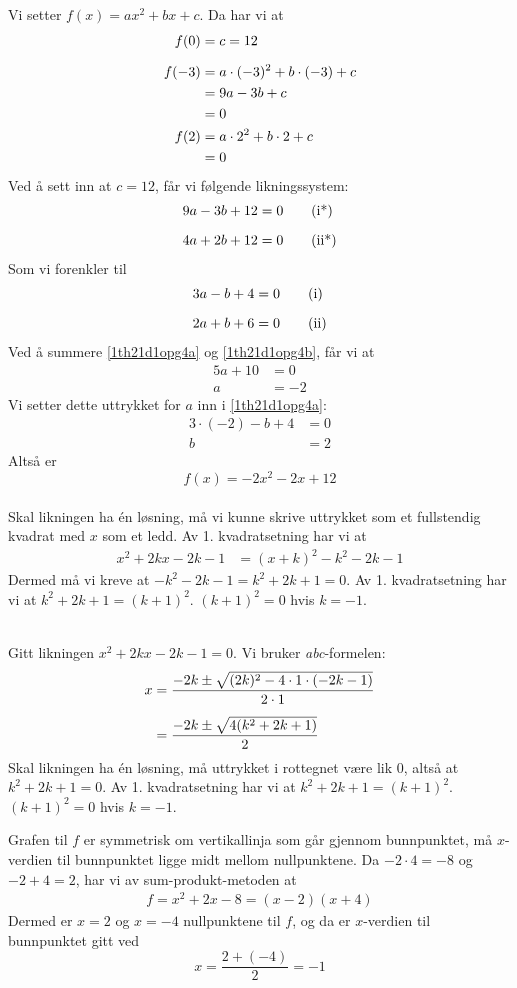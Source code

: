 \newpage
{}
Vi setter $f(x)=ax^2+bx+c$. Da har vi at
\begin{align*}
	f(0)&=c=12 \vn
	f(-3)&=a\cdot(-3)^2+b\cdot(-3)+c \\
	&= 9a-3b+c \\
	&=0 \\
	f(2)&=a\cdot2^2+b\cdot2+c \\
	&= 0
\end{align*}
Ved å sett inn at $c=12$, får vi følgende likningssystem:
\begin{align*}
	9a-3b+12 &= 0 \tag{i*} \vn
	4a+2b+12 &= 0 \tag{ii*}
\end{align*}
Som vi forenkler til
\begin{align*}
	3a-b+4 &= 0 \tag{i}\label{1th21d1opg4a} \vn
	2a+b+6 &= 0 \tag{ii}\label{1th21d1opg4b}
\end{align*}
Ved å summere \eqref{1th21d1opg4a} og \eqref{1th21d1opg4b}, får vi at
\begin{align*}
	5a+10 &= 0 \\
	a &= -2
\end{align*}
Vi setter dette uttrykket for $a$ inn i \eqref{1th21d1opg4a}:
\begin{align*}
	3\cdot(-2)-b+4 &= 0 \\
	b &= 2
\end{align*}
Altså er
\[ f(x)=-2x^2-2x+12 \]
 \vs
{} \\
Skal likningen ha én løsning, må vi kunne skrive uttrykket som et fullstendig kvadrat med $x$ som et ledd. Av 1. kvadratsetning har vi at
\begin{align*}
	x^2+2kx-2k-1 &= (x+k)^2-k^2-2k-1
\end{align*}
Dermed må vi kreve at $-k^2-2k-1=k^2+2k+1=0$. Av 1. kvadratsetning har vi at $k^2+2k+1=(k+1)^2$. $(k+1)^2=0$ hvis $k=-1$. \os

 \\
Gitt likningen $x^2+2kx-2k-1=0$. Vi bruker \textit{abc}-formelen:
\begin{align*}
	x &= \frac{-2k\pm\sqrt{(2k)^2-4\cdot1\cdot(-2k-1)}}{2\cdot1} \br
	&= \frac{-2k\pm\sqrt{4(k^2+2k+1)}}{2}
\end{align*} 
Skal likningen ha én løsning, må uttrykket i rottegnet være lik 0, altså at $k^2+2k+1=0$. Av 1. kvadratsetning har vi at $k^2+2k+1=(k+1)^2$. $(k+1)^2=0$ hvis $k=-1$.

Grafen til $ f $ er symmetrisk om vertikallinja som går gjennom bunnpunktet, må $x$-verdien til bunnpunktet ligge midt mellom nullpunktene. Da $-2\cdot4=-8$ og $-2+4=2$, har vi av sum-produkt-metoden at
\begin{align*}
	f=x^2+2x-8=(x-2)(x+4)
\end{align*}
Dermed er $x=2$ og $x=-4$ nullpunktene til $f$, og da er $x$-verdien til bunnpunktet gitt ved
\[ x=\frac{2+(-4)}{2}=-1 \]

